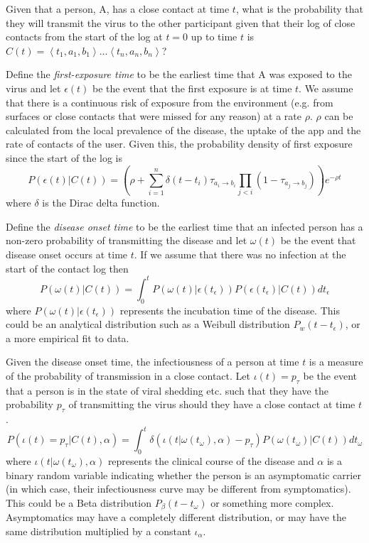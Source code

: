 \documentclass{article}
\begin{document}
Given that a person, A, has a close contact at time $t$, what is the probability that they will transmit the virus to the other participant given that their log of close contacts from the start of the log at $t=0$ up to time $t$ is $C(t) = \left< t_{1},a_1,b_1 \right> ... \left< t_{n},a_n,b_n \right>$?

Define the \textit{first-exposure time} to be the earliest time that A was exposed to the virus and let $\epsilon(t)$ be the event that the first exposure is at time $t$. We assume that there is a continuous risk of exposure from the environment (e.g. from surfaces or close contacts that were missed for any reason) at a rate $\rho$. $\rho$ can be calculated from the local prevalence of the disease, the uptake of the app and the rate of contacts of the user. Given this, the probability density of first exposure since the start of the log is
\[
P\left(\epsilon(t)|C(t)\right) = \left(\rho + \sum_{i=1}^n \delta(t - t_i)\tau_{a_i\rightarrow b_i} \prod_{j<i}(1-\tau_{a_j\rightarrow b_j})\right) e^{-\rho t}
\] 
where $\delta$ is the Dirac delta function.

Define the \textit{disease onset time} to be the earliest time that an infected person has a non-zero probability of transmitting the disease and let $\omega(t)$ be the event that disease onset occurs at time $t$. If we assume that there was no infection at the start of the contact log then
\[
P(\omega(t)|C(t)) = \int_0^{t} P(\omega(t)|\epsilon(t_\epsilon))P(\epsilon(t_\epsilon)|C(t)) dt_\epsilon
\]
where $P(\omega(t)|\epsilon(t_\epsilon))$ represents the incubation time of the disease. This could be an analytical distribution such as a Weibull distribution $P_w(t-t_\epsilon)$, or a more empirical fit to data.

Given the disease onset time, the infectiousness of a person at time $t$ is a measure of the probability of transmission in a close contact. Let $\iota(t) = p_\tau$ be the event that a person is in the state of viral shedding etc. such that they have the probability $p_\tau$ of transmitting the virus should they have a close contact at time $t$.
\[
P(\iota(t) = p_\tau|C(t),\alpha) = \int_0^t \delta(\iota(t|\omega(t_\omega),\alpha)-p_\tau)P(\omega(t_\omega)|C(t)) dt_\omega
\]
where $\iota(t|\omega(t_\omega),\alpha)$ represents the clinical course of the disease and $\alpha$ is a binary random variable indicating whether the person is an asymptomatic carrier (in which case, their infectiousness curve may be different from symptomatics). This could be a Beta distribution $P_\beta(t-t_\omega)$ or something more complex. Asymptomatics may have a completely different distribution, or may have the same distribution multiplied by a constant $\iota_\alpha$.
\end{document}
